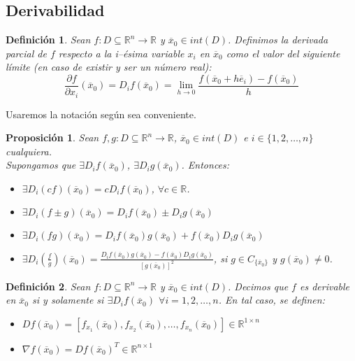 \documentclass[11pt]{report}
\newtheorem{definition}{Definición}[section]
\newtheorem{proposition}{Proposición}[section]
\newcommand{\Rn}{\mathbb{R}^{n}}
\newcommand{\R}{\mathbb{R}}
\newcommand{\ev}{\overline{e}}
\newcommand{\xz}{\overline{x}_{0}}
\newcommand{\Sn}{1,2,\ldots, n}
\newcommand{\fxi}{D_{i}f}
\newcommand{\gxi}{D_{i}g}
\newcommand{\cfxi}{D_{i}(cf)}
\newcommand{\fmgxi}{D_{i}(f\pm g)}
\newcommand{\fpgxi}{D_{i}(fg)}
\newcommand{\fegxi}{D_{i}\left(\frac{f}{g}\right)}
\begin{document}
\subsection{Derivabilidad}

\begin{definition}
Sean $f:D\subseteq\Rn\rightarrow\R$ y $\xz\in int(D)$. Definimos la derivada parcial de $f$ respecto a la i--ésima variable $x_{i}$ en $\xz$ como el valor del siguiente límite (en caso de existir y ser un número real):
$$\frac{\partial f}{\partial x_{i}}(\xz)=\fxi(\xz)=\lim_{h\to 0}\frac{f(\xz+h \ev_{i})-f(\xz)}{h}$$
\end{definition}
Usaremos la notación según sea conveniente.
\begin{proposition}
Sean $f,g:D\subseteq\Rn\rightarrow\R$, $\xz\in int(D)$ e $i\in\{1,2,\ldots,n\}$ cualquiera.\\
Supongamos que $\exists\fxi(\xz)$, $\exists\gxi(\xz)$. Entonces:
\begin{itemize}
\item[(i)] $\exists\cfxi(\xz)=c\fxi(\xz)$, $\forall c\in\R$.
\item[(ii)] $\exists\fmgxi(\xz)=\fxi(\xz)\pm\gxi(\xz)$
\item[(iii)] $\exists\fpgxi(\xz)=\fxi(\xz)g(\xz)+f(\xz)\gxi(\xz)$
\item[(iv)] $\exists\fegxi(\xz)=\frac{\fxi(\xz)g(\xz)-f(\xz)\gxi(\xz)}{[g(\xz)]^{2}}$, si $g\in C_{\{\xz\}}$ y $g(\xz)\ne0$.
\end{itemize}
\end{proposition}

\begin{definition}
Sean $f:D\subseteq\Rn\rightarrow\R$ y $\xz\in int(D)$. Decimos que $f$ es derivable en $\xz$ si y solamente si $\exists\fxi(\xz)$ $\forall i=\Sn$. En tal caso, se definen:
\begin{itemize}
\item[(i)] $D f(\xz)=[f_{x_{1}}(\xz), f_{x_{2}}(\xz), \ldots, f_{x_{n}}(\xz)]\in\R^{1\times n}$
\item[(ii)] $\nabla f(\xz)=D f(\xz)^{T}\in\R^{n\times 1}$
\end{itemize}
\end{definition}
\end{document}
